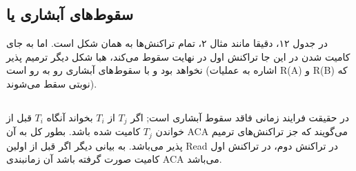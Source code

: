\documentclass[a4paper]{article}
\begin{document}
\subsection{سقوط‌های آبشاری یا }

در جدول ۱۲، دقیقا مانند مثال ۲، تمام تراکنش‌ها به همان شکل است. اما به جای کامیت
شدن در این جا تراکنش اول در نهایت سقوط می‌کند، هبا شکل دیگر ترمیم پذیر نخواهد
بود و با سقوط‌های آبشاری رو به رو است (اشاره به عملیات R(A) و R(B) که نوبتی سقط
می‌شوند).

\begin{LTR}
    \begin{table}[h]
        \centering
        \begin{RTL}
            \caption{بررسی سقوط‌های آبشاری در مثال ۲}
        \end{RTL}
    \end{table}
\end{LTR}

\newpage

\subsection{}

در حقیقت فرایند زمانی فاقد سقوط آبشاری است; اگر $T_{j}$ از $T_{i}$ بخواند آنگاه
$T_{i}$ قبل از خواندن $T_{j}$ کامیت شده باشد. بطور کل به آن ACA می‌گویند که جز
تراکنش‌های ترمیم پذیر می‌باشد. به بیانی دیگر اگر قبل از اولین Read در تراکنش
دوم، در تراکنش اول کامیت صورت گرفته باشد آن زمانبندی ACA می‌باشد.

\begin{LTR}
    \begin{table}[h]
        \centering
        \begin{RTL}
            \caption{نمونه‌ای از فرایند ACA}
        \end{RTL}
    \end{table}
\end{LTR}
\end{document}

